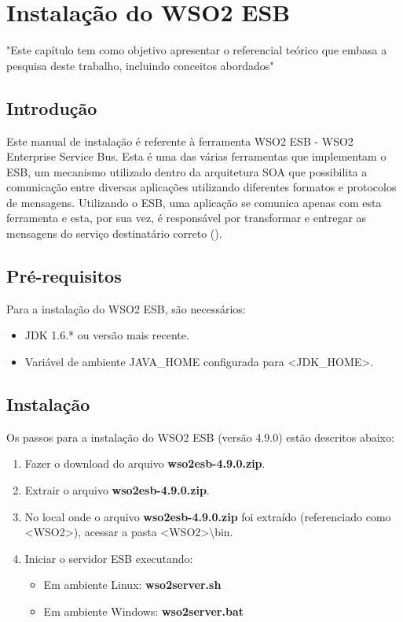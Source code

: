 \chapter[Instalação do WSO2 ESB]{Instalação do WSO2 ESB}
"Este capítulo tem como objetivo apresentar o referencial teórico que embasa a pesquisa deste trabalho, incluindo conceitos abordados"

\section{Introdução}
Este manual de instalação é referente à ferramenta WSO2 ESB - WSO2 Enterprise Service Bus. Esta é uma das várias ferramentas que implementam o ESB, um mecanismo utilizado dentro da arquitetura SOA que possibilita a comunicação entre diversas aplicações utilizando diferentes formatos e protocolos de mensagens. Utilizando o ESB, uma aplicação se comunica apenas com esta ferramenta e esta, por sua vez, é responsável por transformar e entregar as mensagens do serviço destinatário correto (\cite{tutorial_ESB}).

\section{Pré-requisitos}
Para a instalação do WSO2 ESB, são necessários:
\begin{itemize}
\item JDK 1.6.* ou versão mais recente.
\item Variável de ambiente JAVA\_HOME configurada para <JDK\_HOME>.
\end{itemize}

\section{Instalação}
Os passos para a instalação do WSO2 ESB (versão 4.9.0) estão descritos abaixo:
\begin{enumerate}
\item Fazer o download do arquivo \textbf{wso2esb-4.9.0.zip}.
\item Extrair o arquivo \textbf{wso2esb-4.9.0.zip}.
\item No local onde o arquivo \textbf{wso2esb-4.9.0.zip} foi extraído (referenciado como <WSO2>), acessar a pasta <WSO2>\textbackslash bin.
\item Iniciar o servidor ESB executando:
\begin{itemize}
\item Em ambiente Linux: \textbf{wso2server.sh}
\item Em ambiente Windows: \textbf{wso2server.bat}
\end{itemize}
\end{enumerate}

